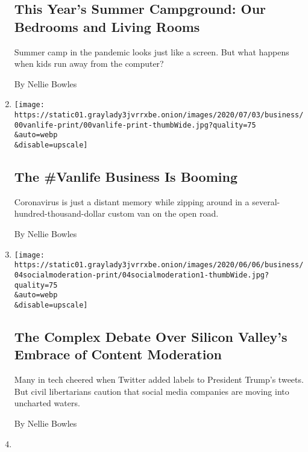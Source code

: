 \begin{enumerate}
  \hypertarget{this-years-summer-campground-our-bedrooms-and-living-rooms}{%
  \subsection{This Year's Summer Campground: Our Bedrooms and Living
  Rooms}\label{this-years-summer-campground-our-bedrooms-and-living-rooms}}

  Summer camp in the pandemic looks just like a screen. But what happens
  when kids run away from the computer?

  By Nellie Bowles
\item
  \href{/2020/07/03/technology/the-vanlife-business-is-booming.html}{}

  \texttt{[image: https://static01.graylady3jvrrxbe.onion/images/2020/07/03/business/00vanlife-print/00vanlife-print-thumbWide.jpg?quality=75\\\&auto=webp\\\&disable=upscale]}

  \hypertarget{the-vanlife-business-is-booming}{%
  \subsection{The \#Vanlife Business Is
  Booming}\label{the-vanlife-business-is-booming}}

  Coronavirus is just a distant memory while zipping around in a
  several-hundred-thousand-dollar custom van on the open road.

  By Nellie Bowles
\item
  \href{/2020/06/05/technology/twitter-trump-facebook-moderation.html}{}

  \texttt{[image: https://static01.graylady3jvrrxbe.onion/images/2020/06/06/business/04socialmoderation-print/04socialmoderation1-thumbWide.jpg?quality=75\\\&auto=webp\\\&disable=upscale]}

  \hypertarget{the-complex-debate-over-silicon-valleys-embrace-of-content-moderation}{%
  \subsection{The Complex Debate Over Silicon Valley's Embrace of
  Content
  Moderation}\label{the-complex-debate-over-silicon-valleys-embrace-of-content-moderation}}

  Many in tech cheered when Twitter added labels to President Trump's
  tweets. But civil libertarians caution that social media companies are
  moving into uncharted waters.

  By Nellie Bowles
\item
  \href{/2020/05/30/technology/bernal-heights.html}{}


\end{enumerate}
